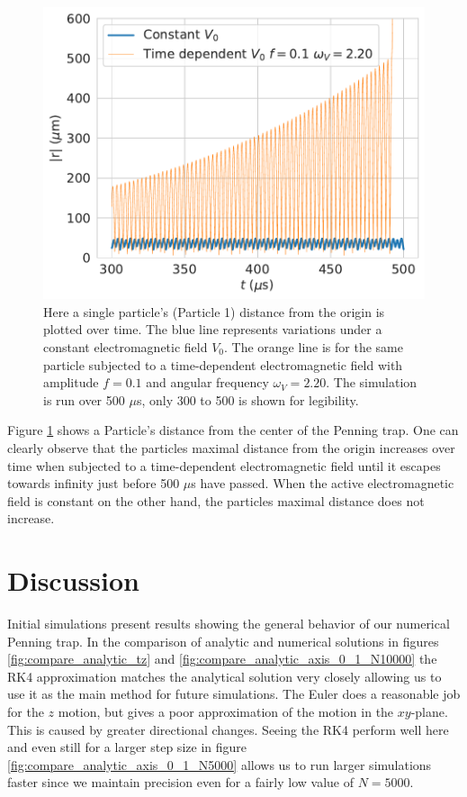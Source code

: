 \documentclass[english,notitlepage,reprint,nofootinbib]{revtex4-1}  %
\begin{document}
\begin{figure}[H]
    \centering
    \includegraphics[width=.5\textwidth]{../figures/ressonance_p1_norm_f0.10_omega_2.20_x_500.pdf}
    \caption{Here a single particle's (Particle 1) distance from the origin is plotted over time. The blue line represents variations under a constant electromagnetic field $V_0$. The orange line is for the same particle subjected to a time-dependent electromagnetic field with amplitude $f = 0.1$ and angular frequency $\omega_V = 2.20$. The simulation is run over 500 $\mu$s, only 300 to 500 is shown for legibility.}
    \label{fig:ressonance_p1_norm_f0}
\end{figure}

Figure \ref{fig:ressonance_p1_norm_f0} shows a Particle's distance from the center of the Penning trap. One can clearly observe that the particles maximal distance from the origin increases over time when subjected to a time-dependent electromagnetic field until it escapes towards infinity just before 500 $\mu$s have passed. When the active electromagnetic field is constant on the other hand, the particles maximal distance does not increase.


\section{Discussion}\label{sec:discussion}

Initial simulations present results showing the general behavior of our numerical Penning trap. In the comparison of analytic and numerical solutions in figures \ref{fig:compare_analytic_tz} and \ref{fig:compare_analytic_axis_0_1_N10000} the RK4 approximation matches the analytical solution very closely allowing us to use it as the main method for future simulations. The Euler does a reasonable job for the $z$ motion, but gives a poor approximation of the motion in the $xy$-plane. This is caused by greater directional changes. Seeing the RK4 perform well here and even still for a larger step size in figure \ref{fig:compare_analytic_axis_0_1_N5000} allows us to run larger simulations faster since we maintain precision even for a fairly low value of $N = 5000$.
\end{document}

